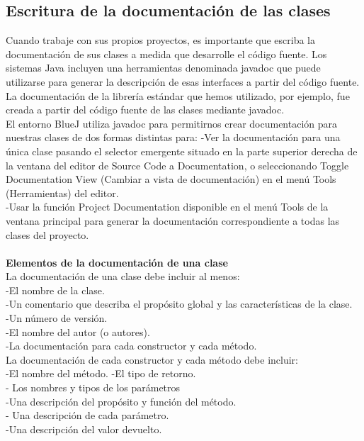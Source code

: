 \documentclass[11pt,a4paper]{article}
\begin{document}
	 \subsection{Escritura de la documentación de las clases}
	 Cuando trabaje con sus propios proyectos, es importante que escriba la documentación de sus
	 clases a medida que desarrolle el código fuente. Los sistemas Java incluyen una herramientas denominada javadoc que puede utilizarse para
	 generar la descripción de esas interfaces a partir del código fuente. La documentación de la librería
	 estándar que hemos utilizado, por ejemplo, fue creada a partir del código fuente de las clases
	 mediante javadoc.\\
	 El entorno BlueJ utiliza javadoc para permitirnos crear documentación para nuestras clases de
	 dos formas distintas para:
	 -Ver la documentación para una única clase pasando el selector emergente situado en la parte
	 superior derecha de la ventana del editor de Source Code a Documentation, o seleccionando
	 Toggle Documentation View (Cambiar a vista de documentación) en el menú Tools (Herramientas)
	 del editor.\\
	 -Usar la función Project Documentation disponible en el menú Tools de la ventana principal para
	 generar la documentación correspondiente a todas las clases del proyecto.\\
	 \\
	 \textbf{Elementos de la documentación de una clase}
	 \\
	 La documentación de una clase debe incluir al menos:\\
	 -El nombre de la clase.\\
	 -Un comentario que describa el propósito global y las características de la clase.\\
	-Un número de versión.\\
	-El nombre del autor (o autores).\\
	-La documentación para cada constructor y cada método.\\
	La documentación de cada constructor y cada método debe incluir:\\
	-El nombre del método.
	-El tipo de retorno.\\
	- Los nombres y tipos de los parámetros
\\	
-Una descripción del propósito y función del método.\\
- Una descripción de cada parámetro.\\
-Una descripción del valor devuelto.\\
\end{document}
